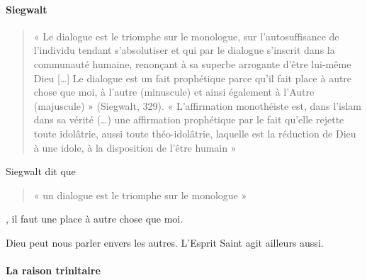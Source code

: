  \paragraph{Siegwalt}
	  \begin{quote}
	     « Le dialogue est le triomphe sur le monologue, sur l’autosuffisance de l’individu tendant s’absolutiser et qui par le dialogue s’inscrit dans la communauté humaine, renonçant à sa superbe arrogante d’être lui-même Dieu […] Le dialogue est un fait prophétique parce qu’il  fait place à autre chose que moi, à l’autre (minuscule) et ainsi également à l’Autre (majuscule) » (Siegwalt, 329). « L’affirmation monothéiste est, dans l’islam dans sa vérité (…) une affirmation prophétique par le fait qu’elle rejette toute idolâtrie, aussi toute théo-idolâtrie, laquelle est la réduction de Dieu à une idole, à la disposition de l’être humain » 
	  \end{quote}
	Siegwalt dit que 
	\begin{quote}
	    « un dialogue est le triomphe sur le monologue »
	\end{quote}, il faut une place à autre chose que moi. 

	Dieu peut nous parler envers les autres. L’Esprit Saint agit ailleurs aussi.
\paragraph{La raison trinitaire  }
 


